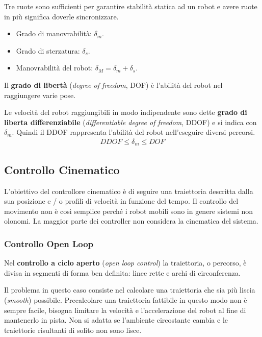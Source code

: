 \documentclass[a4paper,portrait,12pt]{article}
\theoremstyle{definition}
\begin{document}
Tre ruote sono sufficienti per garantire stabilità statica ad un robot e avere ruote in più significa doverle sincronizzare.
\begin{itemize}
\item Grado di manovrabilità: $\delta_m$.
\item Grado di sterzatura: $\delta_s$.
\item Manovrabilità del robot: $\delta_M = \delta_m + \delta_s$. 
\end{itemize}

Il \textbf{grado di libertà} (\emph{degree of freedom}, DOF) è l'abilità del robot nel raggiungere varie pose.

Le velocità del robot raggiungibili in modo indipendente sono dette \textbf{grado di liberta differenziabile} (\emph{differentiable degree of freedom}, DDOF) e si indica con $\delta_m$.
Quindi il DDOF rappresenta l'abilità del robot nell'eseguire diversi percorsi.
\begin{align*}
DDOF \le \delta_m \le DOF
\end{align*}

\subsection{Controllo Cinematico}

L'obiettivo del controllore cinematico è di seguire una traiettoria descritta dalla sua posizione e / o profili di velocità in funzione del tempo.
Il controllo del movimento non è così semplice perché i robot mobili sono in genere sistemi non olonomi.
La maggior parte dei controller non considera la cinematica del sistema.

\subsubsection{Controllo Open Loop}
Nel \textbf{controllo a ciclo aperto} (\emph{open loop control}) la traiettoria, o percorso, è divisa in segmenti di forma ben definita: linee rette e archi di circonferenza.

Il problema in questo caso consiste nel calcolare una traiettoria che sia più liscia (\emph{smooth}) possibile.
Precalcolare una traiettoria fattibile in questo modo non è sempre facile, bisogna limitare la velocità e l'accelerazione del robot al fine di mantenerlo in pista.
Non si adatta se l'ambiente circostante cambia e le traiettorie risultanti di solito non sono lisce.
\end{document}
